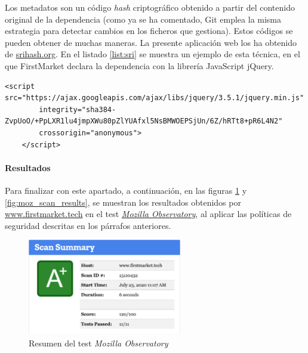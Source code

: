 \documentclass[a4paper,12pt,twoside,openright]{report}
\begin{document}
	Los metadatos son un código \emph{hash} criptográfico obtenido a partir del contenido original de la dependencia (como ya se ha comentado, Git emplea la misma estrategia para detectar cambios en los ficheros que gestiona). Estos códigos se pueden obtener de muchas maneras. La presente aplicación web los ha obtenido de \href{https://www.srihash.org/}{srihash.org}. En el listado \ref{list:sri} se muestra un ejemplo de esta técnica, en el que FirstMarket declara la dependencia con la librería JavaScript jQuery.
	\\
	
	\begin{lstlisting}[caption=Subresource Integrity, label=list:sri]
	<script src="https://ajax.googleapis.com/ajax/libs/jquery/3.5.1/jquery.min.js"
		integrity="sha384-ZvpUoO/+PpLXR1lu4jmpXWu80pZlYUAfxl5NsBMWOEPSjUn/6Z/hRTt8+pR6L4N2"
		crossorigin="anonymous">
	</script>
	\end{lstlisting}
	
	\paragraph{Resultados}
	Para finalizar con este apartado, a continuación, en las figuras \ref{fig:moz_scan_summary} y \ref{fig:moz_scan_results}, se muestran los resultados obtenidos por \href{https://firstmarket.tech}{www.firstmarket.tech} en el test \href{https://observatory.mozilla.org/analyze/www.firstmarket.tech}{\emph{Mozilla Observatory}}, al aplicar las políticas de seguridad descritas en los párrafos anteriores.
	
	\begin{figure}[hbt!]
		\centering
		\includegraphics[width=0.6\textwidth,keepaspectratio]{moz_scan_summary}
		\caption{Resumen del test \emph{Mozilla Observatory}}
		\label{fig:moz_scan_summary}
	\end{figure}
\end{document}

